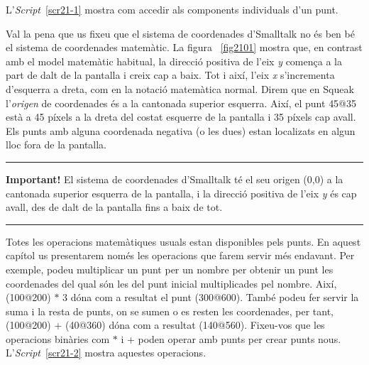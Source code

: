 L'\emph{Script}~\ref{scr21-1} mostra com accedir als components individuals d'un punt.

Val la pena que us fixeu que el sistema de coordenades d'Smalltalk no és ben bé el sistema de coordenades matemàtic. La figura ~\ref{fig2101} mostra que, en contrast amb el model matemàtic habitual, la direcció positiva de l'eix \emph{y} comença a la part de dalt de la pantalla i creix cap a baix. Tot i així, l'eix \emph{x} s'incrementa d'esquerra a dreta, com en la notació matemàtica normal. Direm que en Squeak l'\emph{origen} de coordenades és a la cantonada superior esquerra. Així, el punt \textsf{45@35} està a 45 píxels a la dreta del costat esquerre de la pantalla i 35 píxels cap avall. Els punts amb alguna coordenada negativa (o les dues) estan localizats en algun lloc fora de la pantalla.  

\noindent
\rule{\textwidth}{2pt}
\noindent
\textbf{Important!} El sistema de coordenades d'Smalltalk té el seu origen (0,0) a la cantonada superior esquerra de la pantalla, i la direcció positiva de l'eix \emph{y} és cap avall, des de dalt de la pantalla fins a baix de tot.\\
\noindent
\rule{\textwidth}{2pt}

Totes les operacions matemàtiques usuals estan disponibles pels punts. En aquest capítol us presentarem només les operacions que farem servir més endavant. Per exemple, podeu multiplicar un punt per un nombre per obtenir un punt les coordenades del qual són les del punt inicial multiplicades pel nombre. Així, \textsf{(100@200) $*$ 3} dóna com a resultat el punt \textsf{(300@600)}. També podeu fer servir la suma i la resta de punts, on se sumen o es resten les coordenades, per tant, \textsf{(100@200) + (40@360)} dóna com a resultat \textsf{(140@560)}. Fixeu-vos que les operacions binàries com \textsf{$*$} i \textsf{+} poden operar amb punts per crear punts nous. L'\emph{Script}~\ref{scr21-2} mostra aquestes operacions.

